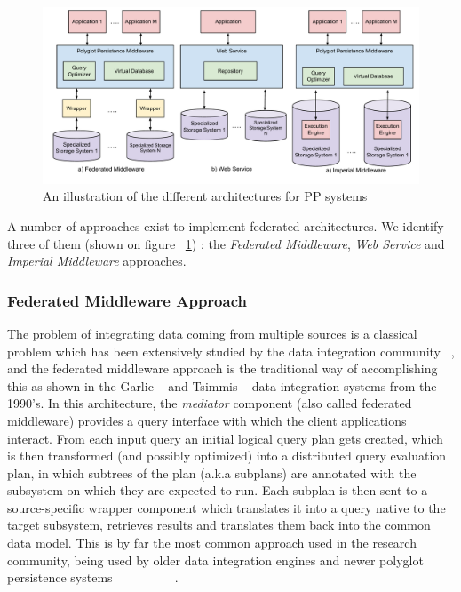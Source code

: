 \begin{figure}
 \centering
  \includegraphics[width=1.1\textwidth]{images/MiddlewareArchitecture.pdf}
  \caption{An illustration of the different architectures for PP systems}
  \label{fig:architectures}
\end{figure}

A number of approaches exist to implement federated architectures. We identify three of them (shown on figure ~\ref{fig:architectures}) : the \emph{Federated Middleware}, \emph{Web Service} and \emph{Imperial Middleware} approaches.

\subsubsection{Federated Middleware Approach}

The problem of integrating data coming from multiple sources is a classical problem which has been extensively studied by the  data integration community ~\cite{Lenzerini2002}, and the federated middleware approach is the traditional way of accomplishing this as shown in the Garlic ~\cite{Carey95} and Tsimmis ~\cite{Chawathe94} data integration systems from the 1990's. In this architecture, the \emph{mediator} component (also called federated middleware) provides a query interface with which the client applications interact. From each input query an initial logical query plan gets created, which is then transformed (and possibly optimized) into a distributed query evaluation plan, in which subtrees of the plan (a.k.a subplans) are annotated with the subsystem on which they are expected to run. Each subplan is then sent to a source-specific wrapper component which translates it into a query native to the target subsystem, retrieves results and translates them back into the common data model. This is by far the most common approach used in the research community, being used by older data integration engines and newer polyglot persistence systems ~\cite{Ives2002} ~\cite{Borkar2006} ~\cite{Liu2010} ~\cite{Botan2010}  ~\cite{Atzeni2012} ~\cite{Sellami2014}. 

